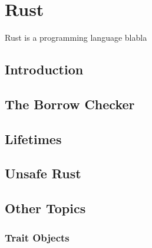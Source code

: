 \chapter{Rust}

Rust is a programming language blabla

\section{Introduction}

\section{The Borrow Checker}

\section{Lifetimes\label{sec:rust-lifetimes}}

\section{Unsafe Rust}

\section{Other Topics}

\subsection{Trait Objects\label{sec:trait-objects}}
